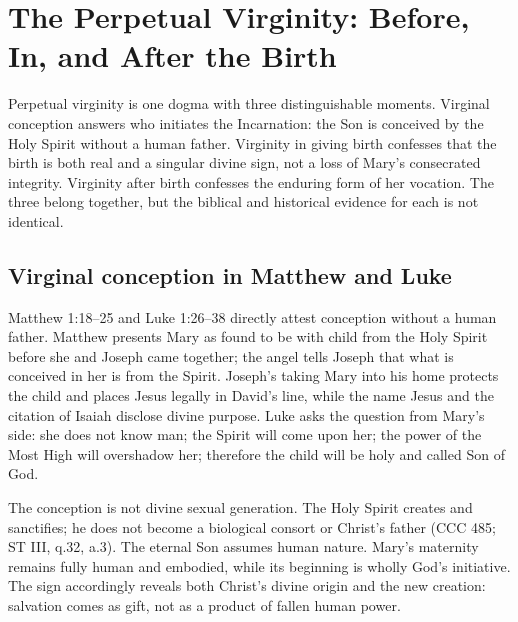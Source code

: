 \section{The Perpetual Virginity: Before, In, and After the Birth}


Perpetual virginity is one dogma with three distinguishable moments. Virginal conception answers who initiates the Incarnation: the Son is conceived by the Holy Spirit without a human father. Virginity in giving birth confesses that the birth is both real and a singular divine sign, not a loss of Mary's consecrated integrity. Virginity after birth confesses the enduring form of her vocation. The three belong together, but the biblical and historical evidence for each is not identical.

\subsection{Virginal conception in Matthew and Luke}

Matthew 1:18--25 and Luke 1:26--38 directly attest conception without a human father. Matthew presents Mary as found to be with child from the Holy Spirit before she and Joseph came together; the angel tells Joseph that what is conceived in her is from the Spirit. Joseph's taking Mary into his home protects the child and places Jesus legally in David's line, while the name Jesus and the citation of Isaiah disclose divine purpose. Luke asks the question from Mary's side: she does not know man; the Spirit will come upon her; the power of the Most High will overshadow her; therefore the child will be holy and called Son of God.

The conception is not divine sexual generation. The Holy Spirit creates and sanctifies; he does not become a biological consort or Christ's father (CCC 485; ST III, q.32, a.3). The eternal Son assumes human nature. Mary's maternity remains fully human and embodied, while its beginning is wholly God's initiative. The sign accordingly reveals both Christ's divine origin and the new creation: salvation comes as gift, not as a product of fallen human power.

